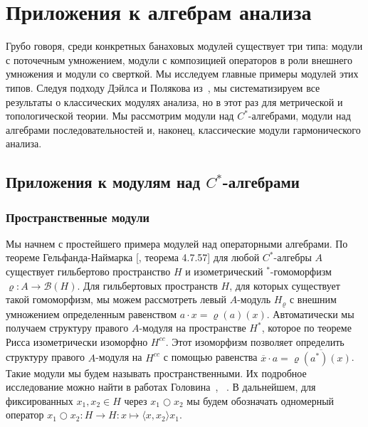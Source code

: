 \chapter{Приложения к алгебрам
    анализа}\label{ChapterApplicationsToAlgebrasOfAnalysis} 

Грубо говоря, среди конкретных банаховых модулей существует три типа: модули с
поточечным умножением, модули с композицией операторов в роли внешнего умножения
и модули со сверткой. Мы исследуем главные примеры модулей этих типов. Следуя
подходу Дэйлса и Полякова из~\cite{DalPolHomolPropGrAlg}, мы систематизируем все
результаты о классических модулях анализа, но в этот раз для метрической и
топологической теории. Мы рассмотрим модули над $C^*$-алгебрами, модули над
алгебрами последовательностей и, наконец, классические модули гармонического
анализа.



\section{Приложения к модулям над 
    \texorpdfstring{$C^*$}{C*}-алгебрами}\label{
        SectionApplicationsToCStarAlgebras}


\subsection{Пространственные модули}\label{SubSectionSpatialModules}

Мы начнем с простейшего примера модулей над операторными алгебрами. По теореме
Гельфанда-Наймарка [\cite{HelBanLocConvAlg}, теорема 4.7.57] для любой
$C^*$-алгебры $A$ существует гильбертово пространство $H$ и изометрический
${}^*$-гомоморфизм $\varrho:A\to\mathcal{B}(H)$. Для гильбертовых пространств
$H$, для которых существует такой гомоморфизм, мы можем рассмотреть  левый
$A$-модуль $H_\varrho$ с внешним умножением определенным равенством $a\cdot
x=\varrho(a)(x)$. Автоматически мы получаем структуру правого $A$-модуля на
пространстве $H^*$, которое по теореме Рисса изометрически изоморфно $H^{cc}$.
Этот изоморфизм позволяет определить структуру правого $A$-модуля на $H^{cc}$ с
помощью равенства $\overline{x}\cdot a=\overline{\varrho(a^*)(x)}$. Такие модули
мы будем называть пространственными. Их подробное исследование можно найти в
работах
Головина~\cite{GolovibHomolPropHilbModOverNestOpAlg},
~\cite{GolovinSpatProjPropInClOfCSLAlg}.
В дальнейшем, для фиксированных $x_1,x_2\in H$ через $x_1\bigcirc x_2$ мы будем
обозначать одномерный оператор $x_1\bigcirc x_2:H\to H:x\mapsto \langle x,
x_2\rangle x_1$. 

